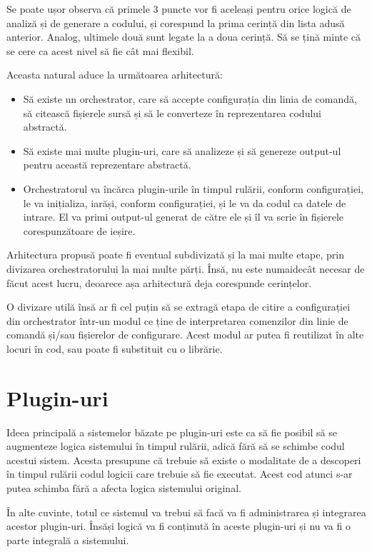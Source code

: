 \documentclass[a4paper,12pt]{report}
\begin{document}
Se poate ușor observa că primele 3 puncte vor fi aceleași pentru orice logică de analiză și de generare a codului, și corespund la prima cerință din lista adusă anterior.
Analog, ultimele două sunt legate la a doua cerință.
Să se țină minte că se cere ca acest nivel să fie cât mai flexibil.

Aceasta natural aduce la următoarea arhitectură:

\begin{itemize}
  \item Să existe un orchestrator, care să accepte configurația din linia de comandă, să citească fișierele sursă și să le converteze în reprezentarea codului abstractă.
  \item Să existe mai multe plugin-uri, care să analizeze și să genereze output-ul pentru această reprezentare abstractă.
  \item Orchestratorul va încărca plugin-urile în timpul rulării, conform configurației, le va inițializa, iarăși, conform configurației, și le va da codul ca datele de intrare. El va primi output-ul generat de către ele și îl va scrie în fișierele corespunzătoare de ieșire.
\end{itemize}

Arhitectura propusă poate fi eventual subdivizată și la mai multe etape, prin divizarea orchestratorului la mai multe părți.
Însă, nu este numaidecât necesar de făcut acest lucru, deoarece așa arhitectură deja corespunde cerințelor.

O divizare utilă însă ar fi cel puțin să se extragă etapa de citire a configurației din orchestrator într-un modul ce ține de interpretarea comenzilor din linie de comandă și/sau fișierelor de configurare.
Acest modul ar putea fi reutilizat în alte locuri în cod, sau poate fi substituit cu o librărie.

\section{Plugin-uri}

Ideea principală a sistemelor băzate pe plugin-uri este ca să fie posibil să se augmenteze logica sistemului în timpul rulării, adică fără să se schimbe codul acestui sistem.
Acesta presupune că trebuie să existe o modalitate de a descoperi în timpul rulării codul logicii care trebuie să fie executat.
Acest cod atunci s-ar putea schimba fără a afecta logica sistemului original.

În alte cuvinte, totul ce sistemul va trebui să facă va fi administrarea și integrarea acestor plugin-uri.
Însăși logică va fi conținută în aceste plugin-uri și nu va fi o parte integrală a sistemului.
\end{document}
